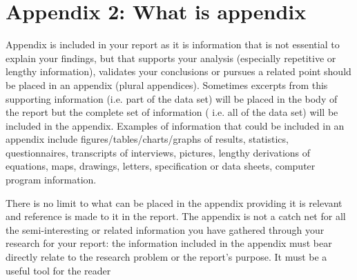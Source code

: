 \chapter{Appendix 2: What is appendix}

Appendix is included in your report as it is information that is not essential to explain your findings, but that supports your analysis (especially repetitive or lengthy information), validates your conclusions or pursues a related point should be placed in an appendix (plural appendices). Sometimes excerpts from this supporting information (i.e. part of the data set) will be placed in the body of the report but the complete set of information ( i.e. all of the data set) will be included in the appendix. Examples of information that could be included in an appendix include figures/tables/charts/graphs of results, statistics, questionnaires, transcripts of interviews, pictures, lengthy derivations of equations, maps, drawings, letters, specification or data sheets, computer program information.

There is no limit to what can be placed in the appendix providing it is relevant and reference is made to it in the report. The appendix is not a catch net for all the semi-interesting or related information you have gathered through your research for your report: the information included in the appendix must bear directly relate to the research problem or the report's purpose. It must be a useful tool for the reader 